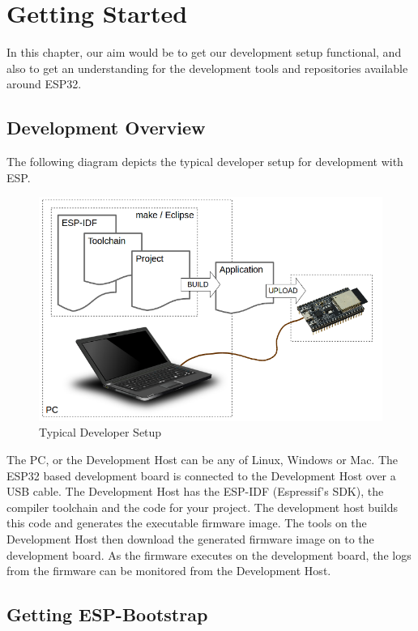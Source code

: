 \documentclass[11pt,fleqn]{book} %
\begin{document}
\chapter{Getting Started}

In this chapter, our aim would be to get our development setup functional, and also to get an understanding for the development tools and repositories available around ESP32.

\section{Development Overview}

The following diagram depicts the typical developer setup for development with ESP.
\begin{figure}[h]
    \centering
    \includegraphics[scale=0.3]{Pictures/dev_setup.png}
    \caption{Typical Developer Setup}
    \label{fig:dev_setup}
\end{figure}

The PC, or the Development Host can be any of Linux, Windows or Mac. The ESP32 based development board is connected to the Development Host over a USB cable. The Development Host has the ESP-IDF (Espressif's SDK), the compiler toolchain and the code for your project. The development host builds this code and generates the executable firmware image. The tools on the Development Host then download the generated firmware image on to the development board. As the firmware executes on the development board, the logs from the firmware can be monitored from the Development Host.

\section{Getting ESP-Bootstrap}
\end{document}
